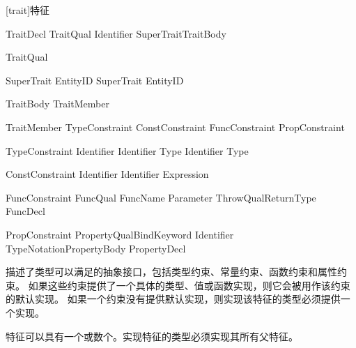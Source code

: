 
[trait]{特征}

\begin{bnf}{TraitDecl}
    TraitQual\bnfs {} Identifier SuperTrait\bnfq TraitBody
\end{bnf}

\begin{bnf}{TraitQual}
\end{bnf}

\begin{bnf}{SuperTrait}
    \terminal{:} EntityID \br
    SuperTrait \terminal{,} EntityID
\end{bnf}

\begin{bnf}{TraitBody}
    \terminal{\{} TraitMember\bnfs \terminal{\}}
\end{bnf}

\begin{bnf}{TraitMember}
    TypeConstraint \br
    ConstConstraint \br
    FuncConstraint \br
    PropConstraint
\end{bnf}

\begin{bnf}{TypeConstraint}
     Identifier \terminal{;} \br
     Identifier \terminal{:} Type \terminal{;} \br
     Identifier \terminal{=} Type \terminal{;}
\end{bnf}

\begin{bnf}{ConstConstraint}
     Identifier \terminal{;} \br
     Identifier \terminal{=} Expression \terminal{;}
\end{bnf}

\begin{bnf}{FuncConstraint}
    FuncQual\bnfs {} FuncName Parameter ThrowQual\bnfq ReturnType \terminal{;} \br
    FuncDecl
\end{bnf}

\begin{bnf}{PropConstraint}
    PropertyQual\bnfs BindKeyword Identifier TypeNotation\bnfq PropertyBody \terminal{;} \br
    PropertyDecl
\end{bnf}

\pnum
{}描述了类型可以满足的抽象接口，包括类型约束、常量约束、函数约束和属性约束。
如果这些约束提供了一个具体的类型、值或函数实现，则它会被用作该约束的默认实现。
如果一个约束没有提供默认实现，则实现该特征的类型必须提供一个实现。

\pnum
特征可以具有一个或数个。实现特征的类型必须实现其所有父特征。